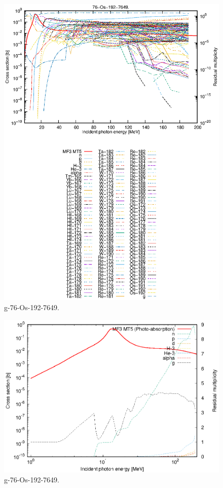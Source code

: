 \begin{figure}
 \includegraphics[width=\linewidth]{eps/g_76-Os-192_7649.eps}
  \caption{g-76-Os-192-7649.}
\end{figure}
\newpage \clearpage

\begin{figure}
 \includegraphics[width=\linewidth]{eps-log/g_76-Os-192_7649.eps}
 \caption{g-76-Os-192-7649.}
\end{figure}
\newpage \clearpage

